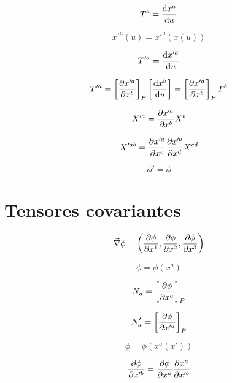 \documentclass[../main]{subfiles}
\begin{document}
\begin{equation}
    T^a=\dv{x^a}{u}(0)
\end{equation}

\begin{equation}
    x'^a(u)=x'^a(x(u))
\end{equation}

\begin{equation}
    T'^a=\dv{x'^a}{u}(0)
\end{equation}

\begin{equation}
    T'^a=\left [ \pdv{x'^a}{x^b} \right]_P \left [ \dv{x^b}{u}(0) \right]=\left [ \pdv{x'^a}{x^b} \right]_P T^b   
\end{equation}

\begin{equation}
    X'^a=\pdv{x'^a}{x^b}X^b
\end{equation}

\begin{equation}
    X'^{ab}=\pdv{x'^a}{x^c} \pdv{x'^b}{x^d}X^{cd}
\end{equation}

\begin{equation}
    \phi'=\phi
\end{equation}

\section{Tensores covariantes}

\begin{equation}
    \Vec{\nabla} \phi=\left ( \pdv{\phi}{x^1},\pdv{\phi}{x^2}, \pdv{\phi}{x^3} \right)
\end{equation}

\begin{equation}
    \phi=\phi(x^a)
\end{equation}

\begin{equation}
    N_a=\left [ \pdv{\phi}{x^a} \right]_P 
\end{equation}

\begin{equation}
    N'_a= \left [ \pdv{\phi}{x'^a} \right]_P 
\end{equation}

\begin{equation*}
    \phi=\phi(x^a(x'))
\end{equation*}

\begin{equation*}
    \pdv{\phi}{x'^b}=\pdv{\phi}{x^a} \pdv{x^a}{x'^b}
\end{equation*}
\end{document}
